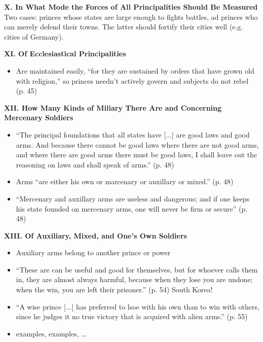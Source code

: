 \documentclass[10pt]{article}
\newcommand{\aside}[1]{{\color{Goldenrod}#1}}
\newcommand{\keyquote}[1]{{\color{BrickRed}#1}}
\begin{document}
\textbf{X. In What Mode the Forces of All Principalities Should 
Be Measured}
    Two cases: princes whose states are large enough to fights battles,
    ad princes who can merely defend their towns. The latter should 
    fortify their cities well (e.g. cities of Germany).

\textbf{XI. Of Ecclesiastical Principalities}
\begin{itemize}
\item 
    Are maintained easily, ``for they are sustained by orders
    that have grown old with religion,'' so princes needn't
    actively govern and subjects do not rebel (p. 45)   
\end{itemize}

\textbf{XII. How Many Kinds of Miliary There Are and Concerning
Mercenary Soldiers}
\begin{itemize}
\item 
    \keyquote{
    ``The principal foundations that all states have [...] are good laws
        and good arms. And because there cannot be good laws where there are
        not good arms, and where there are good arms there must be good laws},
    I shall leave out the reasoning on laws and shall speak of arms.'' 
    (p. 48) 
\item 
    Arms ``are either his own or marcenary or auxillary or mixed.'' 
    (p. 48)
\item
    ``Mercenary and auxillary arms are useless and dangerous; and if one 
    keeps his state founded on mercenary arms, one will never be firm or 
    secure'' (p. 48)
\end{itemize}

\textbf{XIII. Of Auxiliary, Mixed, and One's Own Soldiers}
\begin{itemize}
\item 
    Auxiliary arms belong to another prince or power
\item 
    ``These are can be useful and good for themselves, but for whoever
    calls them in, they are almost always harmful, because when they 
    lose you are undone; when the win, you are left their prisoner.''
    (p. 54) \aside{South Korea!}
\item
    ``A wise prince [...] has preferred to lsoe with his own than to    
    win with others, since he judges it no true victory that is
    acquired with alien arms.'' (p. 55)
\item
     examples, examples, \ldots
\end{itemize}
\end{document}
